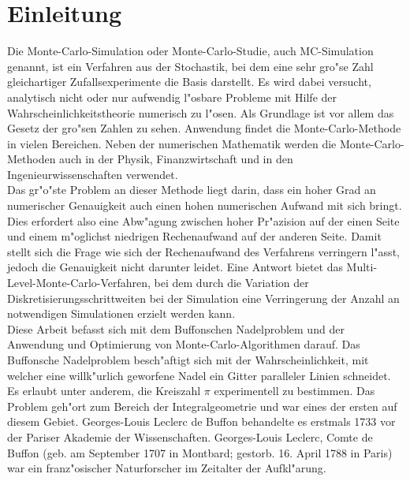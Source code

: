 \section{Einleitung}
Die Monte-Carlo-Simulation oder Monte-Carlo-Studie, auch MC-Simulation genannt, ist ein Verfahren aus der Stochastik, bei dem eine sehr gro"se Zahl gleichartiger Zufallsexperimente die Basis darstellt. Es wird dabei versucht, analytisch nicht oder nur aufwendig l"osbare Probleme mit Hilfe der Wahrscheinlichkeitstheorie numerisch zu l"osen. Als Grundlage ist vor allem das Gesetz der gro"sen Zahlen zu sehen.
Anwendung findet die Monte-Carlo-Methode in vielen Bereichen. Neben der numerischen Mathematik werden die Monte-Carlo-Methoden auch in der Physik, Finanzwirtschaft und in den Ingenieurwissenschaften verwendet.\\
Das gr"o"ste Problem an dieser Methode liegt darin, dass ein hoher Grad an numerischer Genauigkeit auch einen hohen numerischen Aufwand mit sich bringt. Dies erfordert also eine Abw"agung zwischen hoher Pr"azision auf der einen Seite und einem m"oglichst niedrigen Rechenaufwand auf der anderen Seite. Damit stellt sich die Frage wie sich der Rechenaufwand des Verfahrens verringern l"asst, jedoch die Genauigkeit nicht darunter leidet. Eine Antwort bietet das Multi-Level-Monte-Carlo-Verfahren, bei dem durch die Variation der Diskretisierungsschrittweiten bei der Simulation eine Verringerung der Anzahl an notwendigen Simulationen erzielt werden kann.\\[0,1cm]
Diese Arbeit befasst sich mit dem  Buffonschen Nadelproblem und der Anwendung und Optimierung von Monte-Carlo-Algorithmen darauf. 
Das Buffonsche Nadelproblem besch"aftigt sich mit der Wahrscheinlichkeit, mit welcher  eine willk"urlich geworfene Nadel ein Gitter paralleler Linien schneidet. Es erlaubt unter anderem, die Kreiszahl 
$\pi$  experimentell zu bestimmen. Das Problem geh"ort zum Bereich der Integralgeometrie und war eines der ersten auf diesem Gebiet. Georges-Louis Leclerc de Buffon behandelte es erstmals 1733 vor der Pariser Akademie der Wissenschaften. 
Georges-Louis Leclerc, Comte de Buffon (geb. am September 1707 in Montbard; gestorb. 16. April 1788 in Paris) war ein franz"osischer Naturforscher im Zeitalter der Aufkl"arung.\\

